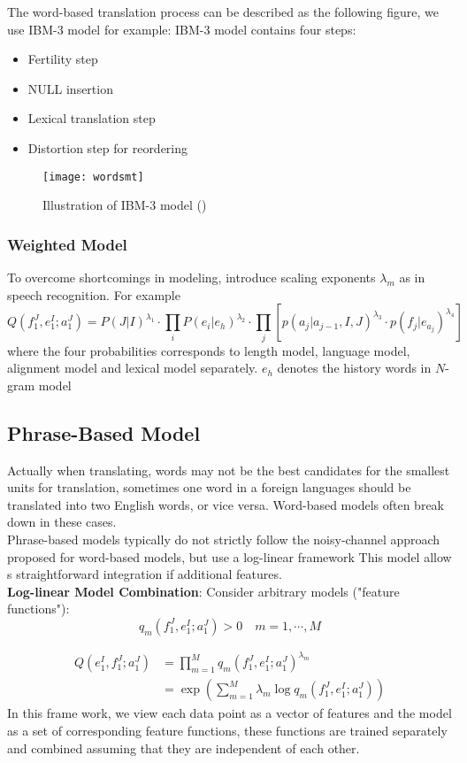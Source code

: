 The word-based translation process can be described as the following figure, we use IBM-3 model for example:  
IBM-3 model contains four steps: 
\begin{itemize}
	\item Fertility step
	\item NULL insertion
	\item Lexical translation step
	\item Distortion step for reordering
\end{itemize}
\begin{figure}[t]
	\texttt{[image: wordsmt]}
	\caption{ Illustration of IBM-3 model (\cite{koehn2009statistical})}
	\centering
\end{figure}




\subsubsection{Weighted Model}
To overcome shortcomings in modeling, introduce scaling exponents ${\lambda_{m}}$ as in speech recognition. For example
\[ Q(f_1^J, e_1^I; a_1^J) = P(J|I)^{\lambda_1} \cdot \prod_{i} P(e_i|e_h)^{\lambda_2} \cdot \prod_{j} [p(a_j|a_{j-1}, I, J)^{\lambda_{3}} \cdot p(f_j|e_{a_j})^{\lambda_4}]  \]
where the four probabilities corresponds to length model, language model, alignment model and lexical model separately. $e_h$ denotes the history words in $N$-gram model



\subsection{Phrase-Based Model}
Actually when translating, words may not be the best candidates for the smallest units for translation, sometimes one word in a foreign languages should be translated into two English words, or vice versa. Word-based models often break down in these cases.\\
Phrase-based models typically do not strictly follow the noisy-channel approach proposed for word-based models, but use a log-linear framework This model allow s straightforward integration if additional features.\\

\textbf{Log-linear Model Combination}:
Consider arbitrary models ("feature functions"):
\[ q_m(f_1^J, e_1^I; a_1^J) > 0  \quad m = 1, \cdots, M\]

\begin{align*}
	Q(e_1^I, f_1^J; a_1^J) & = \prod_{m=1}^{M} q_m(f_1^J, e_1^I; a_1^J)^{\lambda_m} \\
	& = \exp(\sum_{m=1}^{M} \lambda_m \log q_m(f_1^J, e_1^I; a_1^J))
\end{align*}
In this frame work, we view each data point as a vector of features and the model as a set of corresponding feature functions, these functions are trained separately and combined assuming that they are independent of each other.\\ 

